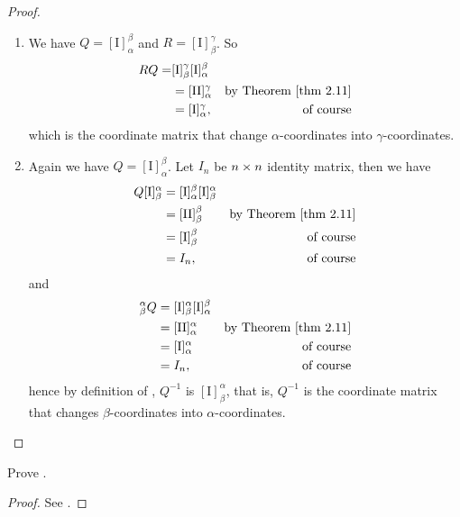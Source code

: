\begin{proof} \ 
\begin{enumerate}
\item We have \(Q = [\mathrm{I}]_{\alpha}^{\beta}\) and \(R = [\mathrm{I}]_{\beta}^{\gamma}\).
So
\begin{align*}
    RQ = & [\mathrm{I}]_{\beta}^{\gamma} [\mathrm{I}]_{\alpha}^{\beta} \\
         & = [\mathrm{I}\mathrm{I}]_{\alpha}^{\gamma} & \text{by \THM{2.11}} \\
         & = [\mathrm{I}]_{\alpha}^{\gamma}, & \text{of course}
\end{align*}
which is the coordinate matrix that change \(\alpha\)-coordinates into \(\gamma\)-coordinates.

\item Again we have \(Q = [\mathrm{I}]_{\alpha}^{\beta}\).
Let \(I_n\) be \(n \times n\) identity matrix, then we have
\begin{align*}
    Q[\mathrm{I}]_{\beta}^{\alpha}
        & = [\mathrm{I}]_{\alpha}^{\beta}[\mathrm{I}]_{\beta}^{\alpha} \\
        & = [\mathrm{I}\mathrm{I}]_{\beta}^{\beta} & \text{by \THM{2.11}} \\
        & = [\mathrm{I}]_{\beta}^{\beta} & \text{of course} \\
        & = I_n, & \text{of course}
\end{align*}
and
\begin{align*}
    [\mathrm{I}]_{\beta}^{\alpha} Q
        & = [\mathrm{I}]_{\beta}^{\alpha} [\mathrm{I}]_{\alpha}^{\beta} \\
        & = [\mathrm{I}\mathrm{I}]_{\alpha}^{\alpha} & \text{by \THM{2.11}} \\
        & = [\mathrm{I}]_{\alpha}^{\alpha} & \text{of course} \\
        & = I_n, & \text{of course}
\end{align*}
hence by definition of , \(Q^{-1}\) is \([\mathrm{I}]_{\beta}^{\alpha}\), that is, \(Q^{-1}\) is the coordinate matrix that changes \(\beta\)-coordinates into \(\alpha\)-coordinates.
\end{enumerate}
\end{proof}

\begin{exercise} \label{exercise 2.5.12}
Prove .
\end{exercise}

\begin{proof}
See .
\end{proof}

